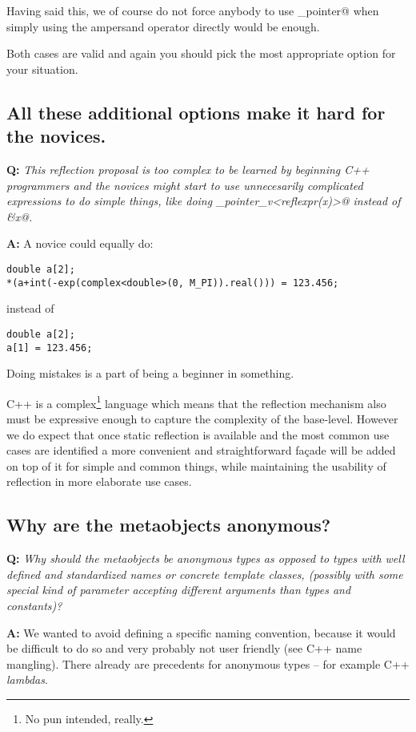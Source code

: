 Having said this, we of course do not force anybody to use \verb@get_pointer@
when simply using the ampersand operator directly would be enough.

Both cases are valid and again you should pick the most appropriate option
for your situation.

\subsection{All these additional options make it hard for the novices.}

\textbf{Q:} {\em This reflection proposal is too complex to be learned by
beginning C++ programmers and the novices might start to use unnecesarily
complicated expressions to do simple things, like doing
\verb@get_pointer_v<reflexpr(x)>@ instead of \verb@&x@.}

\textbf{A:} 
A novice could equally do:

\begin{verbatim}
double a[2];
*(a+int(-exp(complex<double>(0, M_PI)).real())) = 123.456;
\end{verbatim}

instead of

\begin{verbatim}
double a[2];
a[1] = 123.456;
\end{verbatim}

Doing mistakes is a part of being a beginner in something.

C++ is a complex\footnote{No pun intended, really.} language which means that
the reflection mechanism also must be expressive enough to capture
the complexity of the base-level.
However we do expect that once static reflection is available and the most
common use cases are identified a more convenient and straightforward
fa\c{c}ade will be added on top of it for simple and common things,
while maintaining the usability of reflection in more elaborate use cases.

\subsection{Why are the metaobjects anonymous?}

\textbf{Q:} {\em Why should the metaobjects be anonymous types as opposed to
types with well defined and standardized names or concrete template classes, (possibly with some
special kind of parameter accepting different arguments than types and constants)?}

\textbf{A:} We wanted to avoid defining a specific naming convention, because it would
be difficult to do so and very probably not user friendly (see C++ name mangling). There
already are precedents for anonymous types -- for example C++ {\em lambdas}.

